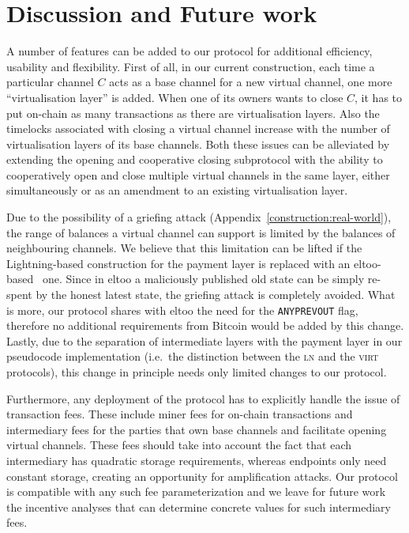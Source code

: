 \section{Discussion and Future work}
  A number of features can be added to our protocol for additional efficiency,
  usability and flexibility. First of all, in our current construction, each
  time a particular channel $C$ acts as a base
  channel for a new virtual channel, one more ``virtualisation layer'' is added. When
  one of its owners wants to close $C$, it has to put on-chain as many
  transactions as there are virtualisation layers. Also the timelocks associated
  with closing a virtual channel increase with the number of virtualisation
  layers of its base channels. Both these issues can be alleviated by extending
  the opening and cooperative closing subprotocol with the ability to
  cooperatively open and close multiple virtual channels in the same layer,
  either simultaneously or as an amendment to an existing virtualisation layer.

  Due to the possibility of a griefing attack
  (Appendix~\ref{construction:real-world}), the range of balances a virtual
  channel can
  support is limited by the balances of neighbouring channels. We believe that
  this limitation can be lifted if the Lightning-based
  construction for the payment layer is replaced with an
  eltoo-based~\cite{eltoo} one. Since in eltoo a maliciously published
  old state can be simply re-spent by the honest latest state, the griefing
  attack is completely avoided. What is more, our protocol shares with eltoo the
  need for the \texttt{ANYPREVOUT} flag, therefore no additional
  requirements from Bitcoin would be added by this change. Lastly,
  due to the separation of intermediate layers with the payment layer in our
  pseudocode implementation (i.e.\ the distinction
  between the \textsc{ln} and the \textsc{virt} protocols), this change
  in principle needs only limited changes to our protocol.

  Furthermore, any deployment of the protocol has to explicitly handle the issue
  of transaction fees. These include miner fees for on-chain transactions and
  intermediary fees for the parties that own base channels and facilitate
  opening virtual channels. These fees should take into account the fact that
  each intermediary has quadratic storage requirements, whereas endpoints only
  need constant storage, creating an opportunity for amplification attacks. Our
  protocol is compatible with any such fee parameterization and we leave for
  future work the incentive analyses that can determine concrete values for such
  intermediary fees.

